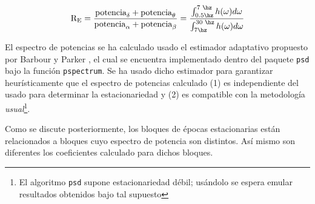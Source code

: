 \begin{equation}
\text{R}_{\text{E}} = \frac{\text{potencia}_{\delta}+\text{potencia}_{\theta}}
{\text{potencia}_{\alpha}+\text{potencia}_{\beta}} =
\frac{\int_{\text 0.5 \hz}^{\text{7 \hz}}h(\omega) d\omega}
{\int_{\text 7 \hz}^{\text{30 \hz}}h(\omega) d\omega}
\label{enlentecimiento}
\end{equation}

El espectro de potencias se ha calculado usado el estimador adaptativo propuesto por
Barbour y Parker \cite{Barbour14}, el cual se encuentra implementado dentro del paquete
\texttt{psd} bajo la función \texttt{pspectrum}.
Se ha usado dicho estimador para garantizar heurísticamente que el espectro de potencias
calculado (1) es independiente del usado para determinar la estacionariedad y (2)
es compatible con la metodología \textit{usual}\footnote{El algoritmo \texttt{psd} 
supone estacionariedad débil; usándolo se espera emular resultados 
obtenidos bajo tal supuesto}.

Como se discute posteriormente, los bloques de épocas estacionarias están relacionados a bloques
cuyo espectro de potencia son distintos. Así mismo son diferentes los coeficientes \lento calculado
para dichos bloques.




